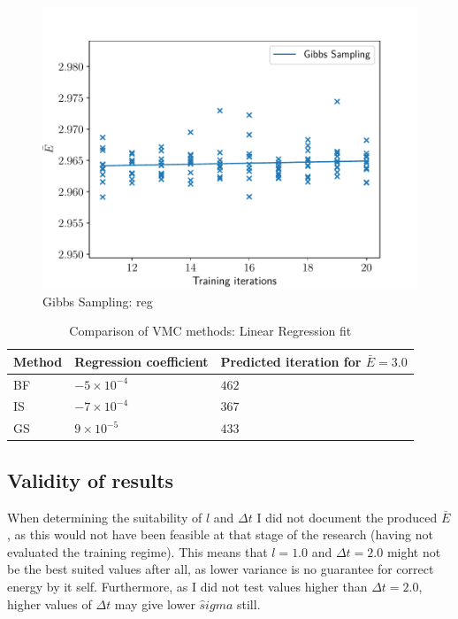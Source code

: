 \documentclass[%
oneside,                 %
final,                   %
10pt]{article}
\begin{document}
\begin{figure}[!h]
        \centering 
         \includegraphics[scale=0.8]{../Results/sim_12/regression/Regression_GS.pdf} 
        \caption{Gibbs Sampling:  reg }
        \label{fig:reg_GS}   
\end{figure}  


\begin{table}[h!]
\begin{center}
\begin{tabular}{lll}
\hline
Method & Regression coefficient & Predicted iteration for $\bar E=3.0$  \\
\hline
BF &  $ -5 \times 10^{ -4 } $ & $ 462 $  \\
IS &  $ -7 \times 10^{ -4 } $ & $ 367 $  \\
GS &  $ 9 \times 10^{ -5 } $ & $433 $  \\
\hline
\end{tabular}
\end{center}
\caption{Comparison of VMC methods: Linear Regression fit}
\label{table:reg}
\end{table}

\subsection{Validity of results}
When determining the suitability of $l$ and $\Delta t$ I did not document the produced $\bar E$, as this would not have been feasible at that stage of the research (having not evaluated the training regime). This means that $l=1.0$ and $\Delta t=2.0$ might not be the best suited values after all, as lower variance is no guarantee for correct energy by it self. Furthermore, as I did not test values higher than $\Delta t=2.0$, higher values of $\Delta t$ may give lower $\hat sigma$ still. 
\end{document}
